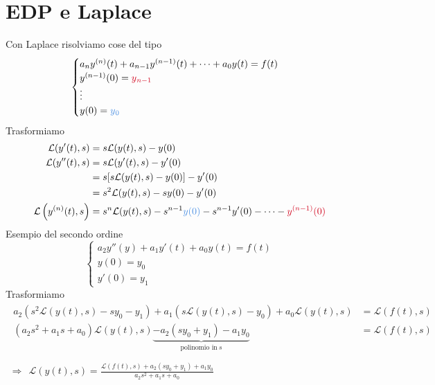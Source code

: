 \section{EDP e Laplace}

Con Laplace risolviamo cose del tipo
\begin{equation*}
\begin{cases}
a_{n} y^{( n)}( t) +a_{n-1} y^{( n-1)}( t) +\cdots +a_{0} y( t) =f( t)\\
y^{( n-1)}( 0) =\textcolor[rgb]{0.82,0.01,0.11}{y}\textcolor[rgb]{0.82,0.01,0.11}{_{n-1}}\\
\vdots \\
y( 0) =\textcolor[rgb]{0.29,0.56,0.89}{y}\textcolor[rgb]{0.29,0.56,0.89}{_{0}}
\end{cases}
\end{equation*}
Trasformiamo
\begin{equation*}
\begin{aligned}
\mathcal{L}( y'( t) ,s) & =s\mathcal{L}( y( t) ,s) -y( 0)\\
\mathcal{L}( y''( t) ,s) & =s\mathcal{L}( y'( t) ,s) -y'( 0)\\
 & =s[ s\mathcal{L}( y( t) ,s) -y( 0)] -y'( 0)\\
 & =s^{2}\mathcal{L}( y( t) ,s) -sy( 0) -y'( 0)\\
\mathcal{L}\left( y^{( n)}( t) ,s\right) & =s^{n}\mathcal{L}( y( t) ,s) -s^{n-1}\textcolor[rgb]{0.29,0.56,0.89}{y}\textcolor[rgb]{0.29,0.56,0.89}{(}\textcolor[rgb]{0.29,0.56,0.89}{0}\textcolor[rgb]{0.29,0.56,0.89}{)} -s^{n-1} y'( 0) -\cdots -\textcolor[rgb]{0.82,0.01,0.11}{y}\textcolor[rgb]{0.82,0.01,0.11}{^{( n-1)}}\textcolor[rgb]{0.82,0.01,0.11}{(}\textcolor[rgb]{0.82,0.01,0.11}{0}\textcolor[rgb]{0.82,0.01,0.11}{)}
\end{aligned}
\end{equation*}
Esempio del secondo ordine
\begin{equation*}
\begin{cases}
a_{2} y''( y) +a_{1} y'( t) +a_{0} y( t) =f( t)\\
y( 0) =y_{0}\\
y'( 0) =y_{1}
\end{cases}
\end{equation*}
Trasformiamo
\begin{gather*}
\begin{aligned}
a_{2}\left( s^{2}\mathcal{L}( y( t) ,s) -sy_{0} -y_{1}\right) +a_{1}( s\mathcal{L}( y( t) ,s) -y_{0}) +a_{0}\mathcal{L}( y( t) ,s) & =\mathcal{L}( f( t) ,s)\\
\left( a_{2} s^{2} +a_{1} s+a_{0}\right)\mathcal{L}( y( t) ,s)\underbrace{-a_{2}( sy_{0} +y_{1}) -a_{1} y_{0}}_{\text{polinomio in} \ s} & =\mathcal{L}( f( t) ,s)
\end{aligned}\\
\\
\Rightarrow \ \ \mathcal{L}( y( t) ,s) =\frac{\mathcal{L}( f( t) ,s) +a_{2}( sy_{0} +y_{1}) +a_{1} y_{0}}{a_{2} s^{2} +a_{1} s+a_{0}}
\end{gather*}
